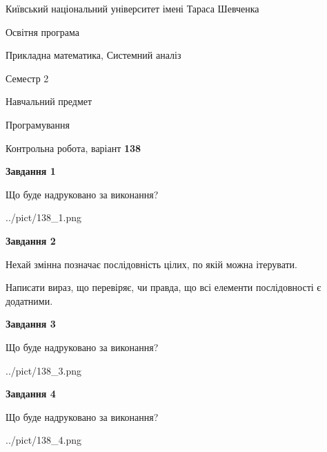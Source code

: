 \documentclass[12pt, ukrainian]{article}
\begin{document}
{{\begin {small}\par
{ \center  Київський національний університет імені Тараса Шевченка \par}
{\parbox {5 cm}{Освітня програма \hfill}{\parbox {8 cm}{Прикладна математика, Системний аналіз \hfill}}\parbox {5 cm}{\hfill Семестр 2}}\par
{\parbox {5 cm} {Навчальний предмет \hfill}\parbox {7 cm}{Програмування \hfill}\parbox {6cm}{\hfill}\par}\vspace{-7pt} \end{small}}{\center Контрольна робота, варіант  \No \textbf
{ 138 }\par}}
{
\begin {large}
{\begin {center}\textbf{Завдання 1}\end {center}}\par
Що буде надруковано за виконання?\par\par
\begin{center}
	{../pict/138_1.png}
\end{center}
\newpage

{\begin {center}\textbf{Завдання 2}\end {center}}\par
Нехай змінна  позначає послідовність цілих, по якій можна ітерувати.

Написати вираз, що перевіряє, чи правда, що всі елементи послідовності є додатни\-ми.\par
\newpage

{\begin {center}\textbf{Завдання 3}\end {center}}\par
Що буде надруковано за виконання?\par
\begin{center}
	{../pict/138_3.png}
\end{center}
\newpage

{\begin {center}\textbf{Завдання 4}\end {center}}\par
Що буде надруковано за виконання?\par
\begin{center}
	{../pict/138_4.png}
\end{center}
\newpage


\end{large}}
\end{document}
